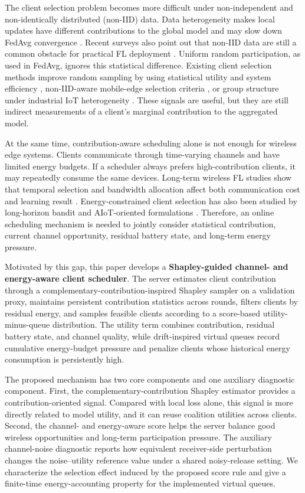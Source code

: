 \documentclass[journal]{IEEEtran}
\begin{document}
The client selection problem becomes more difficult under non-independent and non-identically distributed (non-IID) data. Data heterogeneity makes local updates have different contributions to the global model and may slow down FedAvg convergence \cite{li2020convergence}. Recent surveys also point out that non-IID data are still a common obstacle for practical FL deployment \cite{lu2024noniidsurvey}. Uniform random participation, as used in FedAvg, ignores this statistical difference. Existing client selection methods improve random sampling by using statistical utility and system efficiency \cite{lai2021oort}, non-IID-aware mobile-edge selection criteria \cite{zhang2021client}, or group structure under industrial IoT heterogeneity \cite{li2022fedgs}. These signals are useful, but they are still indirect measurements of a client's marginal contribution to the aggregated model.

At the same time, contribution-aware scheduling alone is not enough for wireless edge systems. Clients communicate through time-varying channels and have limited energy budgets. If a scheduler always prefers high-contribution clients, it may repeatedly consume the same devices. Long-term wireless FL studies show that temporal selection and bandwidth allocation affect both communication cost and learning result \cite{xu2021client}. Energy-constrained client selection has also been studied by long-horizon bandit and AIoT-oriented formulations \cite{zhu2024cmabenergy,zhang2025eecsfl}. Therefore, an online scheduling mechanism is needed to jointly consider statistical contribution, current channel opportunity, residual battery state, and long-term energy pressure.

Motivated by this gap, this paper develops a \textbf{Shapley-guided channel- and energy-aware client scheduler}. The server estimates client contribution through a complementary-contribution-inspired Shapley sampler on a validation proxy, maintains persistent contribution statistics across rounds, filters clients by residual energy, and samples feasible clients according to a score-based utility-minus-queue distribution. The utility term combines contribution, residual battery state, and channel quality, while drift-inspired virtual queues record cumulative energy-budget pressure and penalize clients whose historical energy consumption is persistently high.

The proposed mechanism has two core components and one auxiliary diagnostic component. First, the complementary-contribution Shapley estimator provides a contribution-oriented signal. Compared with local loss alone, this signal is more directly related to model utility, and it can reuse coalition utilities across clients. Second, the channel- and energy-aware score helps the server balance good wireless opportunities and long-term participation pressure. The auxiliary channel-noise diagnostic reports how equivalent receiver-side perturbation changes the noise--utility reference value under a shared noisy-release setting. We characterize the selection effect induced by the proposed score rule and give a finite-time energy-accounting property for the implemented virtual queues.
\end{document}
